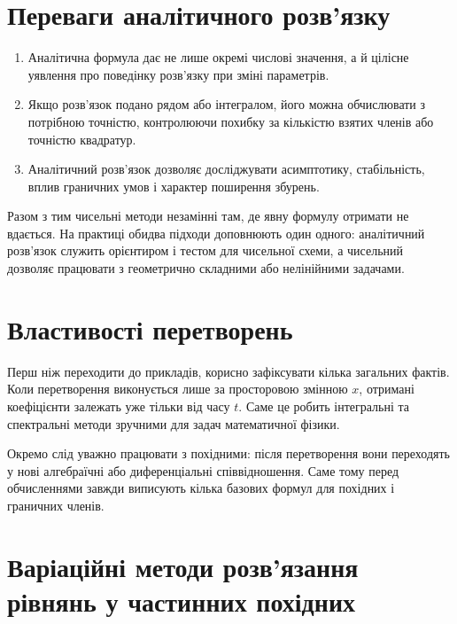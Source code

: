\documentclass[
  ukrainian,
]{article}
\providecommand{\tightlist}{%
  \setlength{\itemsep}{0pt}\setlength{\parskip}{0pt}}
\begin{document}
\section{Переваги аналітичного
розв'язку}\label{ux43fux435ux440ux435ux432ux430ux433ux438-ux430ux43dux430ux43bux456ux442ux438ux447ux43dux43eux433ux43e-ux440ux43eux437ux432ux44fux437ux43aux443}

\begin{enumerate}
\def\labelenumi{\arabic{enumi}.}
\tightlist
\item
  Аналітична формула дає не лише окремі числові значення, а й цілісне
  уявлення про поведінку розв'язку при зміні параметрів.
\item
  Якщо розв'язок подано рядом або інтегралом, його можна обчислювати з
  потрібною точністю, контролюючи похибку за кількістю взятих членів або
  точністю квадратур.
\item
  Аналітичний розв'язок дозволяє досліджувати асимптотику, стабільність,
  вплив граничних умов і характер поширення збурень.
\end{enumerate}

Разом з тим чисельні методи незамінні там, де явну формулу отримати не
вдається. На практиці обидва підходи доповнюють один одного: аналітичний
розв'язок служить орієнтиром і тестом для чисельної схеми, а чисельний
дозволяє працювати з геометрично складними або нелінійними задачами.

\section{Властивості
перетворень}\label{ux432ux43bux430ux441ux442ux438ux432ux43eux441ux442ux456-ux43fux435ux440ux435ux442ux432ux43eux440ux435ux43dux44c}

Перш ніж переходити до прикладів, корисно зафіксувати кілька загальних
фактів. Коли перетворення виконується лише за просторовою змінною \(x\),
отримані коефіцієнти залежать уже тільки від часу \(t\). Саме це робить
інтегральні та спектральні методи зручними для задач математичної
фізики.

Окремо слід уважно працювати з похідними: після перетворення вони
переходять у нові алгебраїчні або диференціальні співвідношення. Саме
тому перед обчисленнями завжди виписують кілька базових формул для
похідних і граничних членів.

\section{Варіаційні методи розв'язання рівнянь у частинних
похідних}\label{ux432ux430ux440ux456ux430ux446ux456ux439ux43dux456-ux43cux435ux442ux43eux434ux438-ux440ux43eux437ux432ux44fux437ux430ux43dux43dux44f-ux440ux456ux432ux43dux44fux43dux44c-ux443-ux447ux430ux441ux442ux438ux43dux43dux438ux445-ux43fux43eux445ux456ux434ux43dux438ux445}
\end{document}
